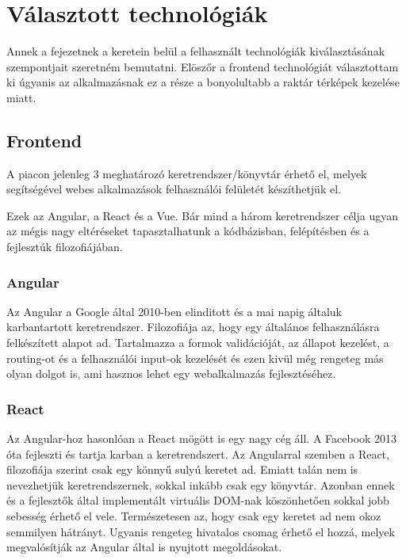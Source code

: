 \chapter{Választott technológiák}

Annek a fejezetnek a keretein belül a felhasznált technológiák kiválasztásának szempontjait szeretném bemutatni. 
Elöszőr a frontend technológiát választottam ki úgyanis az alkalmazásnak ez a része a bonyolultabb a raktár térképek kezelése miatt.

\section{Frontend}

A piacon jelenleg 3 meghatározó keretrendszer/könyvtár érhető el, melyek segítségével webes alkalmazások felhasználói felületét készíthetjük el.

Ezek az Angular, a React és a Vue. 
Bár mind a három keretrendszer célja ugyan az mégis nagy eltéréseket tapasztalhatunk a kódbázisban, felépítésben és a fejlesztúk filozofiájában.

\subsection{Angular}
Az Angular a Google által 2010-ben elinditott és a mai napig általuk karbantartott keretrendszer.
Filozofiája az, hogy egy általános felhasználásra felkészített alapot ad. 
Tartalmazza a formok validációját, az állapot kezelést, a routing-ot és a felhasználói input-ok kezelését és ezen kivül még rengeteg más olyan dolgot is, ami hasznos lehet egy webalkalmazás fejlesztéséhez.

\subsection{React}
Az Angular-hoz hasonlóan a React mögött is egy nagy cég áll.
A Facebook 2013 óta fejleszti és tartja karban a keretrendszert.
Az Angularral szemben a React, filozofiája szerint csak egy könnyű sulyú keretet ad. 
Emiatt talán nem is nevezhetjük keretrendszernek, sokkal inkább csak egy könyvtár. 
Azonban ennek és a fejlesztők által implementált virtuális DOM-nak köszönhetően sokkal jobb sebesség érhető el vele.
Természetesen az, hogy csak egy keretet ad nem okoz semmilyen hátrányt.
Ugyanis rengeteg hivatalos csomag érhető el hozzá, melyek megvalósítják az Angular által is nyujtott megoldásokat.

